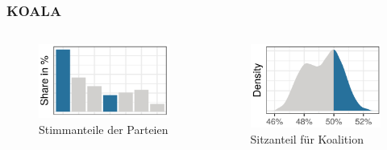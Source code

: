 \documentclass[aspectratio=169,xcolor=dvipsnames]{beamer}
\begin{document}
\begin{frame}
\frametitle{KOALA}
\begin{columns}
\begin{column}{0.5\textwidth}
\begin{figure}[t!]
\includegraphics[height=0.5\textheight]{partyshare}
\caption{Stimmanteile der Parteien}
\end{figure}
\end{column}
\begin{column}{0.5\textwidth}
\begin{figure}[h!]
\includegraphics[height=0.5\textheight]{poe}
\caption{Sitzanteil für Koalition}
\end{figure}
\end{column}
\end{columns}
\end{frame}
\end{document}
